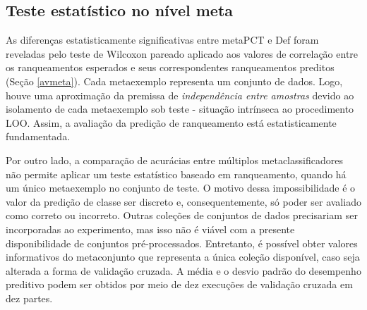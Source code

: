 \subsection{Teste estatístico no nível meta}\label{testestmeta}
As diferenças estatisticamente significativas entre metaPCT e Def foram reveladas pelo teste de Wilcoxon pareado \cite{journals/jmlr/Demsar06} aplicado aos valores de correlação entre os ranqueamentos esperados e seus correspondentes ranqueamentos preditos (Seção \ref{avmeta}).
Cada metaexemplo representa um conjunto de dados.
Logo, houve uma aproximação da premissa de \textit{independência entre amostras} devido ao isolamento de cada metaexemplo sob teste - situação intrínseca ao procedimento LOO.
Assim, a avaliação da predição de ranqueamento está estatisticamente fundamentada.

Por outro lado, a comparação de acurácias entre múltiplos metaclassificadores não permite aplicar um teste estatístico baseado em ranqueamento, quando há um único metaexemplo no conjunto de teste.
O motivo dessa impossibilidade é o valor da predição de classe ser discreto e, consequentemente, só poder ser avaliado como correto ou incorreto.
Outras coleções de conjuntos de dados precisariam ser incorporadas ao experimento,
mas isso não é viável com a presente disponibilidade de conjuntos pré-processados.
Entretanto, é possível obter valores informativos do metaconjunto que representa a única coleção disponível, caso seja alterada a forma de validação cruzada.
A média e o desvio padrão do desempenho preditivo podem ser obtidos por meio de dez execuções de validação cruzada em dez partes.

